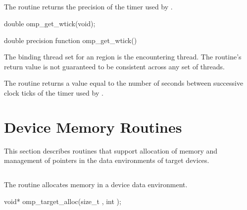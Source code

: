 \pagebreak
\subsection{}
\label{subsec:omp_get_wtick}
\summary
The  routine returns the precision of the timer used by 
.

\format
\ccppspecificstart
\begin{boxedcode}
double omp\_get\_wtick(void);
\end{boxedcode}
\ccppspecificend

\fortranspecificstart
\begin{boxedcode}
double precision function omp\_get\_wtick()
\end{boxedcode}
\fortranspecificend

\binding
The binding thread set for an  region is the encountering thread. The 
routine’s return value is not guaranteed to be consistent across any set of threads.

\effect
The  routine returns a value equal to the number of seconds between 
successive clock ticks of the timer used by .







\pagebreak
\ccppspecificstart
\vspace{-3\baselineskip}
\section{Device Memory Routines}
\label{sec:device_memory}
This section describes routines that support allocation of memory and 
management of pointers in the data environments of target devices.



\subsection{}
\label{subsec:omp_target_alloc}
\summary
The  routine allocates memory in a device data
environment.

\format
\begin{boxedcode}
void* omp\_target\_alloc(size\_t , int );
\end{boxedcode}

